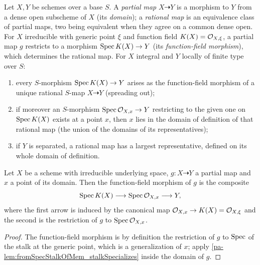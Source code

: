 \begin{definition}
  \label{pa-def:rational_map_machinery}
  \mathlibok

  Let \(X, Y\) be schemes over a base \(S\). A \emph{partial map} \(X \dashrightarrow Y\)
  is a morphism to \(Y\) from a dense open subscheme of \(X\) (its \emph{domain}); a
  \emph{rational map} is an equivalence class of partial maps, two being equivalent when
  they agree on a common dense open. For \(X\) irreducible with generic point \(\xi\) and
  function field \(K(X) = \mathcal{O}_{X,\xi}\), a partial map \(g\) restricts to a morphism
  \(\operatorname{Spec} K(X) \to Y\) (its \emph{function-field morphism}), which determines the rational
  map. For \(X\) integral and \(Y\) locally of finite type over \(S\):
  \begin{enumerate}
    \item every \(S\)-morphism \(\operatorname{Spec} K(X) \to Y\) arises as the function-field morphism
      of a unique rational \(S\)-map \(X \dashrightarrow Y\) (spreading out);
    \item if moreover an \(S\)-morphism \(\operatorname{Spec} \mathcal{O}_{X,x} \to Y\) restricting to the
      given one on \(\operatorname{Spec} K(X)\) exists at a point \(x\), then \(x\) lies in the domain
      of definition of that rational map (the union of the domains of its
      representatives);
    \item if \(Y\) is separated, a rational map has a largest representative, defined on
      its whole domain of definition.
  \end{enumerate}
\end{definition}

\begin{lemma}
  \label{pa-lem:partialMap_fromFunctionField_eq}
  \leanok

  Let \(X\) be a scheme with irreducible underlying space, \(g : X \dashrightarrow Y\) a
  partial map and \(x\) a point of its domain. Then the function-field morphism of \(g\)
  is the composite
  \[
    \operatorname{Spec} K(X) \longrightarrow \operatorname{Spec} \mathcal{O}_{X,x}
      \longrightarrow Y,
  \]
  where the first arrow is induced by the canonical map
  \(\mathcal{O}_{X,x} \to K(X) = \mathcal{O}_{X,\xi}\) and the second is the restriction of \(g\) to
  \(\operatorname{Spec} \mathcal{O}_{X,x}\).
\end{lemma}
\begin{proof}
  \leanok
  The function-field morphism is by definition the restriction of \(g\) to
  \(\operatorname{Spec}\) of the stalk at the generic point, which is a generalization of \(x\); apply
  \ref{pa-lem:fromSpecStalkOfMem_stalkSpecializes} inside the domain of \(g\).
\end{proof}

